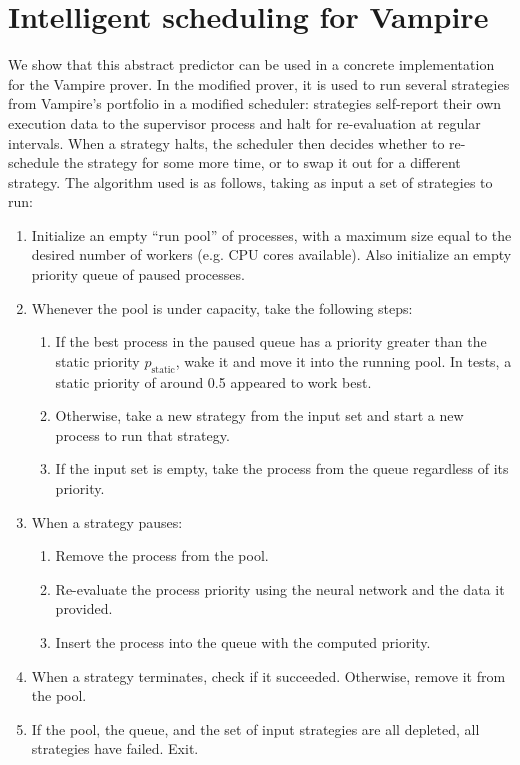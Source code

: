 \documentclass{scrartcl}
\begin{document}
\section{Intelligent scheduling for Vampire}
We show that this abstract predictor can be used in a concrete implementation for the Vampire prover.
In the modified prover, it is used to run several strategies from Vampire's portfolio in a modified scheduler: strategies self-report their own execution data to the supervisor process and halt for re-evaluation at regular intervals.
When a strategy halts, the scheduler then decides whether to re-schedule the strategy for some more time, or to swap it out for a different strategy.
The algorithm used is as follows, taking as input a set of strategies to run:
\begin{enumerate}
	\item Initialize an empty ``run pool'' of processes, with a maximum size equal to the desired number of workers (e.g. CPU cores available). Also initialize an empty priority queue of paused processes.
	\item Whenever the pool is under capacity, take the following steps:
	\begin{enumerate}
		\item If the best process in the paused queue has a priority greater than the static priority \(p_\textrm{static}\), wake it and move it into the running pool. In tests, a static priority of around 0.5 appeared to work best.
		\item Otherwise, take a new strategy from the input set and start a new process to run that strategy.
		\item If the input set is empty, take the process from the queue regardless of its priority.
	\end{enumerate}
	\item When a strategy pauses:
	\begin{enumerate}
		\item Remove the process from the pool.
		\item Re-evaluate the process priority using the neural network and the data it provided.
		\item Insert the process into the queue with the computed priority.
	\end{enumerate}
	\item When a strategy terminates, check if it succeeded. Otherwise, remove it from the pool.
	\item If the pool, the queue, and the set of input strategies are all depleted, all strategies have failed. Exit.
\end{enumerate}
\end{document}
